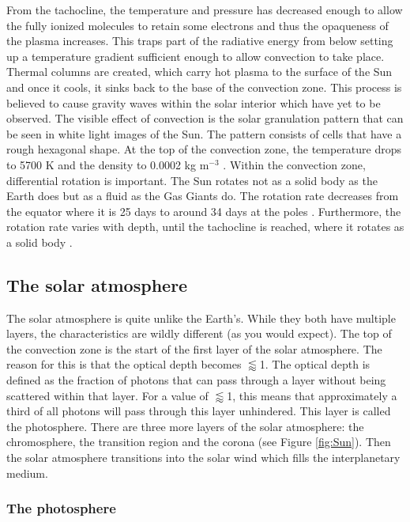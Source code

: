     From the tachocline, the temperature and pressure has decreased enough to allow the fully ionized molecules to retain some electrons and thus the opaqueness of the plasma increases.
    This traps part of the radiative energy from below setting up a temperature gradient sufficient enough to allow convection to take place.
    Thermal columns are created, which carry hot plasma to the surface of the Sun and once it cools, it sinks back to the base of the convection zone.
    This process is believed to cause gravity waves within the solar interior which have yet to be observed.
    The visible effect of convection is the solar granulation pattern that can be seen in white light images of the Sun.  
    The pattern consists of cells that have a rough hexagonal shape. 
    At the top of the convection zone, the temperature drops to 5700 K and the density to 0.0002 kg m$^{-3}$ \citep{gai2000sun}. 
    Within the convection zone, differential rotation is important.
    The Sun rotates not as a solid body as the Earth does but as a fluid as the Gas Giants do. 
    The rotation rate decreases from the equator where it is 25 days to around 34 days at the poles \citep{2000SoPh..191...47B}.
    Furthermore, the rotation rate varies with depth, until the tachocline is reached, where it rotates as a solid body \citep{Howe31032000}.
    
\subsection{The solar atmosphere}
 
    The solar atmosphere is quite unlike the Earth's.
    While they both have multiple layers, the characteristics are wildly different (as you would expect). 
    The top of the convection zone is the start of the first layer of the solar atmosphere.
    The reason for this is that the optical depth becomes $\lessapprox$1.
    The optical depth is defined as the fraction of photons that can pass through a layer without being scattered within that layer.
    For a value of $\lessapprox$1, this means that approximately a third of all photons will pass through this layer unhindered.
    This layer is called the photosphere.
    There are three more layers of the solar atmosphere: the chromosphere, the transition region and the corona (see Figure \ref{fig:Sun}).
    Then the solar atmosphere transitions into the solar wind which fills the interplanetary medium.
    
\subsubsection{The photosphere}

